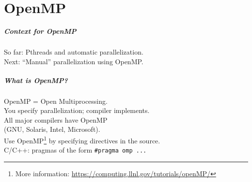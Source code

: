 \documentclass[aspectratio=43]{beamer}
\newenvironment{changemargin}[1]{%
  \begin{list}{}{%
    \setlength{\topsep}{0pt}%
    \setlength{\leftmargin}{#1}%
    \setlength{\rightmargin}{1em}
    \setlength{\listparindent}{\parindent}%
    \setlength{\itemindent}{\parindent}%
    \setlength{\parsep}{\parskip}%
  }%
  \item[]}{\end{list}}
\begin{document}
\part{OpenMP}
\frame{\partpage}

\begin{frame}[containsverbatim]
  \frametitle{Context for OpenMP}

  \begin{changemargin}{2.5cm}
    So far: Pthreads and automatic parallelization.\\[1em]
    Next: ``Manual'' parallelization using OpenMP.
  \end{changemargin}
\end{frame}

\begin{frame}[containsverbatim]
  \frametitle{What is OpenMP?}

  \begin{changemargin}{2.5cm}
    OpenMP = Open Multiprocessing.\\[2em]
    You specify parallelization; compiler implements.\\[1em]
    All major compilers have OpenMP \\
    \qquad (GNU, Solaris,
      Intel, Microsoft).\\[1em]

  Use OpenMP\footnote{More information:
    \url{https://computing.llnl.gov/tutorials/openMP/}} by specifying
  directives in the source. \\[1em]
  C/C++: pragmas of the
  form \verb+#pragma omp ...+
  \end{changemargin}
\end{frame}
\end{document}
